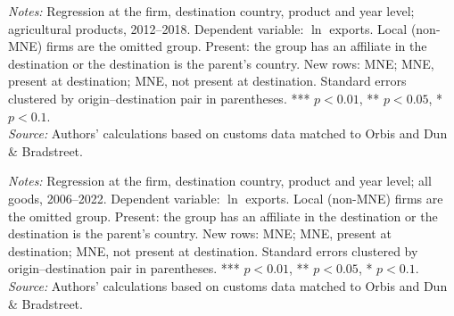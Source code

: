 \documentclass[11pt,a4paper]{article}
\begin{document}
\clearpage
\begin{table}[H]\centering\footnotesize\renewcommand{\arraystretch}{0.92}
  \caption{Distance and Firm Agricultural Exports: Multinationals by Presence at the Destination (con las dummies en nivel)}
  \par\vspace{3pt}
  \begin{minipage}{0.95\textwidth}\footnotesize
  \textit{Notes:} Regression at the firm, destination country, product and year level; agricultural products, 2012--2018. Dependent variable: $\ln$ exports. Local (non-MNE) firms are the omitted group. Present: the group has an affiliate in the destination or the destination is the parent's country. New rows: MNE; MNE, present at destination; MNE, not present at destination. Standard errors clustered by origin--destination pair in parentheses. *** $p<0.01$, ** $p<0.05$, * $p<0.1$.\\[3pt]
  \textit{Source:} Authors' calculations based on customs data matched to Orbis and Dun \& Bradstreet.
  \end{minipage}
\end{table}

\begin{table}[H]\centering\footnotesize\renewcommand{\arraystretch}{0.92}
  \caption{Distance and Firm Exports, All Goods: Multinationals by Presence at the Destination (con las dummies en nivel)}
  \par\vspace{3pt}
  \begin{minipage}{0.95\textwidth}\footnotesize
  \textit{Notes:} Regression at the firm, destination country, product and year level; all goods, 2006--2022. Dependent variable: $\ln$ exports. Local (non-MNE) firms are the omitted group. Present: the group has an affiliate in the destination or the destination is the parent's country. New rows: MNE; MNE, present at destination; MNE, not present at destination. Standard errors clustered by origin--destination pair in parentheses. *** $p<0.01$, ** $p<0.05$, * $p<0.1$.\\[3pt]
  \textit{Source:} Authors' calculations based on customs data matched to Orbis and Dun \& Bradstreet.
  \end{minipage}
\end{table}
\end{document}
